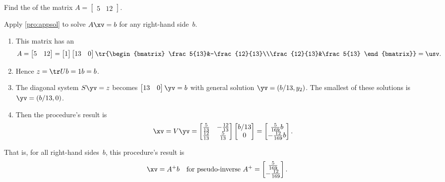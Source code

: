 \begin{example} \label{eg:}
Find the  of the matrix \(A=\begin{bmatrix} 5&12 \end{bmatrix}\).
\begin{solution} 
Apply \autoref{pro:appsol} to solve \(A\xv=b\) for any right-hand side~\(b\).
\begin{enumerate}
\item This matrix has an \svd\ 
\begin{equation*}
A=\begin{bmatrix} 5&12 \end{bmatrix}
=\begin{bmatrix} 1 \end{bmatrix}
\begin{bmatrix} 13& 0 \end{bmatrix}
\tr{\begin{bmatrix} \frac5{13}&-\frac{12}{13}\\\frac{12}{13}&\frac5{13} \end{bmatrix}}
=\usv.
\end{equation*}

\item Hence \(z=\tr Ub=1b=b\).
\item The diagonal system \(S\yv=z\) becomes \(\begin{bmatrix} 13&0 \end{bmatrix}\yv=b\) with general solution \(\yv=(b/13,y_2)\).
The smallest of these solutions is \(\yv=(b/13,0)\).
\item Then the procedure's result is 
\begin{equation*}
\xv=V\yv=\begin{bmatrix} \frac5{13}&-\frac{12}{13}\\\frac{12}{13}&\frac5{13} \end{bmatrix}\begin{bmatrix} b/13\\0 \end{bmatrix}
=\begin{bmatrix} \frac5{169}b\\-\frac{12}{169}b \end{bmatrix}.
\end{equation*}

\end{enumerate}
That is, for all right-hand sides~\(b\), this procedure's result is
\begin{equation*}
\xv=A^+b\quad\text{for pseudo-inverse }A^+=\begin{bmatrix} \frac5{169}\\-\frac{12}{169} \end{bmatrix}.
\end{equation*}
\end{solution}
\end{example}




